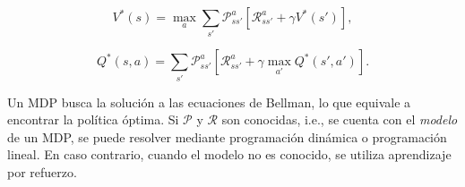 \begin{equation}
\label{eq:optimal-value-f}
V^*(s) = \max_{a}\sum_{s'}\mathcal{P}_{ss'}^a[\mathcal{R}_{ss'}^a + \gamma V^*(s')],
\end{equation}

\begin{equation}
\label{eq:optimal-action-value-f}
Q^*(s,a) = \sum_{s'}\mathcal{P}_{ss'}^a[\mathcal{R}_{ss'}^a + \gamma \max_{a'}Q^*(s',a')].
\end{equation}


Un MDP busca la solución a las ecuaciones de Bellman, lo que equivale a encontrar
la política óptima. Si $\mathcal{P}$ y $\mathcal{R}$ son conocidas, i.e., se cuenta con el \textit{modelo} de un MDP, se puede resolver mediante programación dinámica o programación lineal. En caso contrario, cuando el modelo no es conocido, se utiliza aprendizaje por refuerzo.






